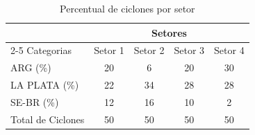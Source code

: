 \begin{table}[ht]
\centering
\begin{tabular}{@{}lcccc@{}}
\toprule
& \multicolumn{4}{c}{Setores} \\
\cmidrule(l){2-5}
Categorias & Setor 1 & Setor 2 & Setor 3 & Setor 4 \\ \midrule
ARG (\%) & 20 & 6 & 20 & 30 \\
LA PLATA (\%) & 22 & 34 & 28 & 28 \\
SE-BR (\%) & 12 & 16 & 10 & 2 \\
Total de Ciclones & 50 & 50 & 50 & 50 \\ \bottomrule
\end{tabular}
\caption{Percentual de ciclones por setor}
\label{tab:cyclones}
\end{table}